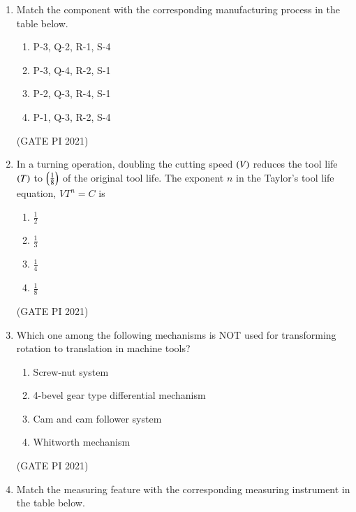 \documentclass[journal,12pt,onecolumn]{IEEEtran}
\theoremstyle{remark}
\begin{document}
\begin{enumerate}
\item
Match the component with the corresponding manufacturing process in the table below.\\



\begin{multicols}{4}
\begin{enumerate}
\item P-3, Q-2, R-1, S-4
\item P-3, Q-4, R-2, S-1
\item P-2, Q-3, R-4, S-1
\item P-1, Q-3, R-2, S-4
\end{enumerate}
\end{multicols}

\hfill (GATE PI 2021)

\item
In a turning operation, doubling the cutting speed $\left(V\right)$ reduces the tool life $\left(T\right)$ to $\left(\frac{1}{8}\right)$ of the original tool life. The exponent $n$ in the Taylor's tool life equation, $VT^n = C$ is

\begin{multicols}{4}
\begin{enumerate}
\item $\frac{1}{2}$
\item $\frac{1}{3}$
\item $\frac{1}{4}$
\item $\frac{1}{8}$
\end{enumerate}
\end{multicols}

\hfill (GATE PI 2021)

\item
Which one among the following mechanisms is NOT used for transforming rotation to translation in machine tools?
\begin{multicols}{2}
\begin{enumerate}
\item Screw-nut system
\item 4-bevel gear type differential mechanism
\item Cam and cam follower system
\item Whitworth mechanism
\end{enumerate}
\end{multicols}

\hfill (GATE PI 2021)

\item
Match the measuring feature with the corresponding measuring instrument in the table below.\\


\end{enumerate}
\end{document}
